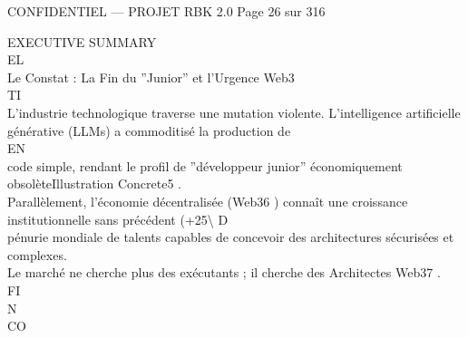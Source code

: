 \vspace{0.5em}
\vspace{0.5em}
\vspace{0.5em}
\begin{confidential}CONFIDENTIEL — PROJET RBK 2.0                                Page 26 sur 316\end{confidential}
EXECUTIVE SUMMARY\\
\vspace{0.5em}
\vspace{0.5em}
\vspace{0.5em}
\vspace{0.5em}
EL\\
Le Constat : La Fin du ”Junior” et l’Urgence Web3\\
\vspace{0.5em}
\vspace{0.5em}
\vspace{0.5em}
\vspace{0.5em}
TI\\
L’industrie technologique traverse une mutation violente. L’intelligence artificielle générative (LLMs) a commoditisé la production de\\
\vspace{0.5em}
\vspace{0.5em}
\vspace{0.5em}
\vspace{0.5em}
EN\\
code simple, rendant le profil de ”développeur junior” économiquement obsolèteIllustration Concrete5 .\\
Parallèlement, l’économie décentralisée (Web36 ) connaît une croissance institutionnelle sans précédent (+25\textbackslash{}%
\vspace{0.5em}
\vspace{0.5em}
\vspace{0.5em}
\vspace{0.5em}
D\\
pénurie mondiale de talents capables de concevoir des architectures sécurisées et complexes.\\
Le marché ne cherche plus des exécutants ; il cherche des Architectes Web37 .\\
\vspace{0.5em}
\vspace{0.5em}
\vspace{0.5em}
FI\\
N\\
CO\\
